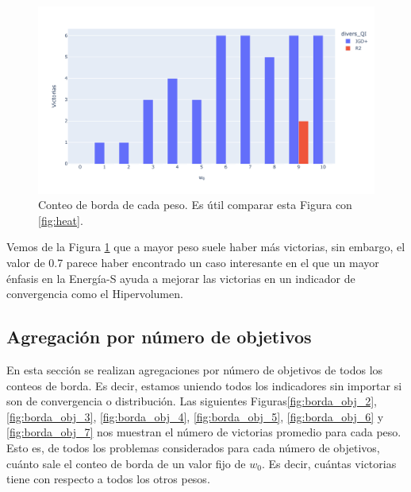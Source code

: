 \begin{figure}[H]
    \centering
    \includegraphics[width=\textwidth]{Figuras/conteo_borda_WFG4_obj3_indhv.pdf}
    \caption[Conteo de borda]{Conteo de borda de cada peso. Es útil comparar esta Figura con \ref{fig:heat}.}
    \label{fig:borda_problema}
\end{figure}

Vemos de la Figura \ref{fig:borda_problema} que a mayor peso suele haber más victorias, sin embargo, el valor de 0.7 parece haber encontrado un caso interesante en el que un mayor énfasis en la Energía-S ayuda a mejorar las victorias en un indicador de convergencia como el Hipervolumen. 

\subsection{Agregación por número de objetivos}

En esta sección se realizan agregaciones por número de objetivos de todos los conteos de borda. Es decir, estamos uniendo todos los indicadores sin importar si son de convergencia o distribución. Las siguientes Figuras\ref{fig:borda_obj_2}, \ref{fig:borda_obj_3}, \ref{fig:borda_obj_4}, \ref{fig:borda_obj_5}, \ref{fig:borda_obj_6} y  \ref{fig:borda_obj_7} nos muestran el número de victorias promedio para cada peso. Esto es, de todos los problemas considerados para cada número de objetivos, cuánto sale el conteo de borda de un valor fijo de $w_0$. Es decir, cuántas victorias tiene con respecto a todos los otros pesos.   

